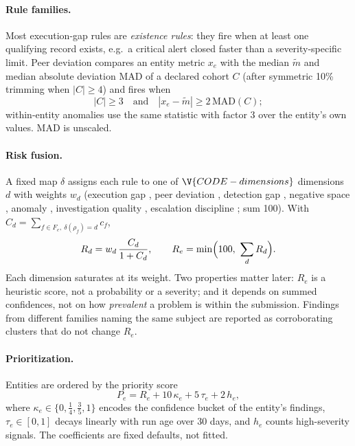 \paragraph{Rule families.} Most execution-gap rules are \emph{existence rules}: they
fire when at least one qualifying record exists, e.g.\ a critical alert closed faster
than a severity-specific limit. Peer deviation compares an entity metric $x_e$ with the
median $\tilde m$ and median absolute deviation $\mathrm{MAD}$ of a declared cohort
$C$ (after symmetric 10\% trimming when $|C|\ge 4$) and fires when
\begin{equation}
|C|\ge 3 \quad\text{and}\quad |x_e-\tilde m| \ge 2\,\mathrm{MAD}(C);
\label{eq:peer}
\end{equation}
within-entity anomalies use the same statistic with factor $3$ over the entity's own
values. MAD is unscaled.

\paragraph{Risk fusion.} A fixed map $\delta$ assigns each rule to one of
$\V{CODE-dimensions}$ dimensions $d$ with weights $w_d$ (execution gap
, peer deviation , detection gap
, negative space , anomaly
, investigation quality ,
escalation discipline ; sum 100). With
$C_d=\sum_{f\in F_e,\ \delta(\rho_f)=d} c_f$,
\begin{equation}
R_d = w_d\,\frac{C_d}{1+C_d},\qquad R_e=\min\Bigl(100,\ \sum_d R_d\Bigr).
\label{eq:risk}
\end{equation}
Each dimension saturates at its weight. Two properties matter later: $R_e$ is a
heuristic score, not a probability or a severity; and it depends on summed confidences,
not on how \emph{prevalent} a problem is within the submission. Findings from different
families naming the same subject are reported as corroborating clusters that do not
change $R_e$.

\paragraph{Prioritization.} Entities are ordered by the priority score
\begin{equation}
P_e = R_e + 10\,\kappa_e + 5\,\tau_e + 2\,h_e,
\label{eq:priority}
\end{equation}
where $\kappa_e\in\{0,\tfrac14,\tfrac35,1\}$ encodes the confidence bucket of the entity's
findings, $\tau_e\in[0,1]$ decays linearly with run age over 30 days, and $h_e$ counts
high-severity signals. The coefficients are fixed defaults, not fitted.

